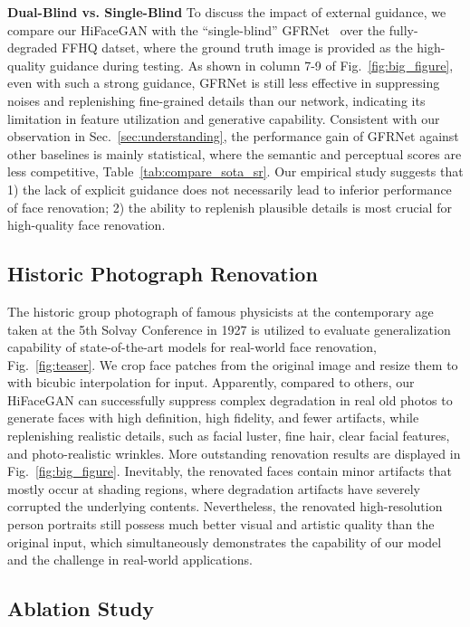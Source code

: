 \documentclass[sigconf]{acmart}
\begin{document}
\textbf{Dual-Blind vs. Single-Blind}
To discuss the impact of external guidance, we compare our HiFaceGAN with the ``single-blind'' GFRNet~\cite{BlindFR-ECCV2018} over the fully-degraded FFHQ datset, where the ground truth image is provided as the high-quality guidance during testing. As shown in column 7-9 of Fig.~\ref{fig:big_figure}, even with such a strong guidance, GFRNet is still less effective in suppressing noises and replenishing fine-grained details than our network, indicating its limitation in feature utilization and generative capability. Consistent with our observation in Sec.~\ref{sec:understanding}, the performance gain of GFRNet against other baselines is mainly statistical, where the semantic and perceptual scores are less competitive, Table~\ref{tab:compare_sota_sr}. Our empirical study suggests that 1) the lack of explicit guidance does not necessarily lead to inferior performance of face renovation; 2) the ability to replenish plausible details is most crucial for high-quality face renovation.

\subsection{Historic Photograph Renovation}\label{sec:HPR}

The historic group photograph of famous physicists at the contemporary age taken at the 5th Solvay Conference in 1927 is utilized to evaluate generalization capability of state-of-the-art models for real-world face renovation, Fig.~\ref{fig:teaser}. We crop  face patches from the original image and resize them to  with bicubic interpolation for input. Apparently, compared to others, our HiFaceGAN can successfully suppress complex degradation in real old photos to generate faces with high definition, high fidelity, and fewer artifacts, while replenishing realistic details, such as facial luster, fine hair, clear facial features, and photo-realistic wrinkles. More outstanding renovation results are displayed in Fig.~\ref{fig:big_figure}. Inevitably, the renovated faces contain minor artifacts that mostly occur at shading regions, where degradation artifacts have severely corrupted the underlying contents. Nevertheless, the renovated high-resolution person portraits still possess much better visual and artistic quality than the original input, which simultaneously demonstrates the capability of our model and the challenge in real-world applications.

\subsection{Ablation Study}\label{sec:ablation}
\end{document}
